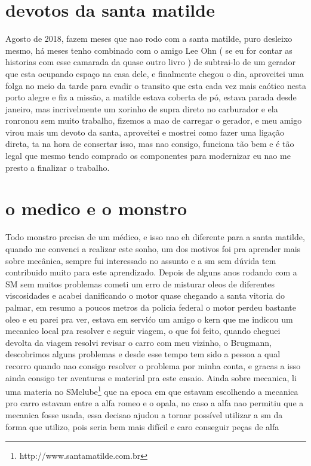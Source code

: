 \documentclass[a4paper]{report}
\begin{document}
\section*{devotos da santa matilde}

Agosto de 2018, fazem meses que nao rodo com a santa matilde, puro desleixo mesmo, h\'a meses tenho combinado com o amigo Lee Ohn ( se eu for contar as historias com esse camarada da quase outro livro ) de subtrai-lo de um gerador que esta ocupando espa\c{c}o na casa dele, e finalmente chegou o dia, aproveitei uma folga no meio da tarde para evadir o transito que esta cada vez mais ca\'otico nesta porto alegre e fiz a miss\~ao, a matilde estava coberta de p\'o, estava parada desde janeiro, mas incrivelmente um xorinho de supra direto no carburador e ela ronronou sem muito trabalho, fizemos a mao de carregar o gerador, e meu amigo virou mais um devoto da santa, aproveitei e mostrei como fazer uma liga\c{c}\~ao direta, ta na hora de consertar isso, mas nao consigo, funciona t\~ao bem e \'e t\~ao legal que mesmo tendo comprado os componentes para modernizar eu nao me presto a finalizar o trabalho. 

\section*{o medico e o monstro}

Todo monstro precisa de um m\'edico, e isso nao eh diferente para a santa matilde, quando me convenci a realizar este sonho, um dos motivos foi pra
aprender mais sobre mec\^anica, sempre fui interessado no assunto e a sm sem d\'uvida tem contribuido muito para este aprendizado.
Depois de alguns anos rodando com a SM sem muitos problemas cometi um erro de misturar oleos de diferentes viscosidades e acabei danificando o motor quase chegando a santa vitoria do palmar, em resumo a poucos metros da policia federal o motor perdeu bastante oleo e eu parei pra ver, estava em servi\'co um amigo o kern que me indicou um mecanico local pra resolver e seguir viagem, o que foi feito, quando cheguei devolta da viagem resolvi revisar o carro com meu vizinho, o Brugmann, descobrimos alguns problemas e desde esse tempo tem sido a pessoa a qual recorro quando nao consigo resolver o problema por minha conta, e gracas a isso ainda consigo ter aventuras e material pra este ensaio.
Ainda sobre mecanica, li uma materia no SMclube\footnote{http://www.santamatilde.com.br} que na epoca em que estavam escolhendo a mecanica pro carro estavam entre a alfa romeo e o opala, no caso a alfa nao permitiu que a mecanica fosse usada,  essa decisao ajudou a tornar poss\'ivel  utilizar a sm da forma que utilizo, pois seria bem mais dif\'icil e caro conseguir pe\c{c}as de alfa


\clearpage

\printindex
 
\end{document}
